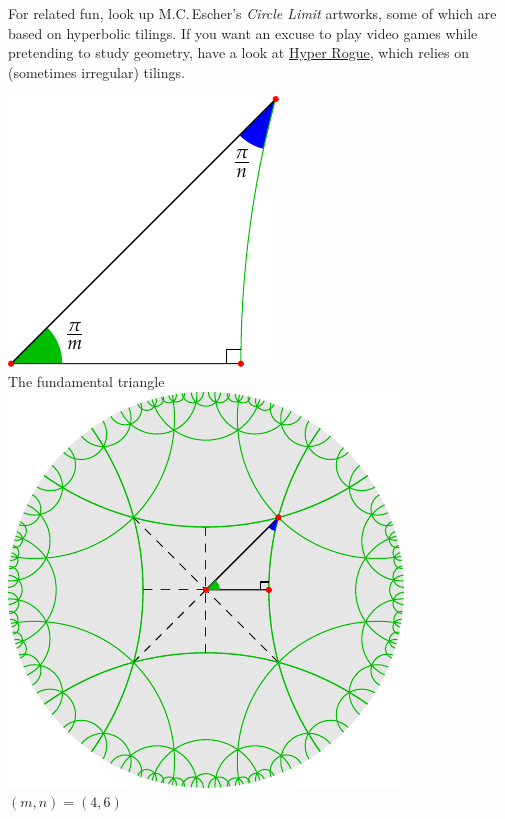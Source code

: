\begin{minipage}[t]{0.55\linewidth}
For related fun, look up M.C.\,Escher's \emph{Circle Limit} artworks, some of which are based on hyperbolic tilings.
If you want an excuse to play video games while pretending to study geometry, have a look at \href{http://www.roguetemple.com/z/hyper/}{Hyper Rogue}, which relies on (sometimes irregular) tilings.
\end{minipage}\begin{minipage}[t]{0.45\linewidth}\vspace{-20pt}
\centering
\includegraphics{isom-right3}\\
The fundamental triangle\bigbreak
\includegraphics{isom-tiling}\\
$(m,n)=(4,6)$\bigbreak

\end{minipage}
